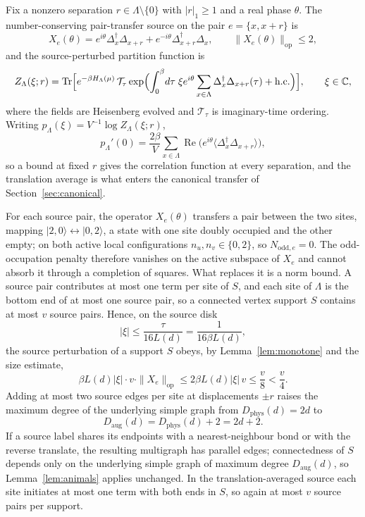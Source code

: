 \documentclass[11pt]{article}
\theoremstyle{plain}
\theoremstyle{definition}
\DeclareMathOperator{\Tr}{Tr}
\newcommand{\Dphys}{D_{\mathrm{phys}}}
\newcommand{\Daug}{D_{\mathrm{aug}}}
\newcommand{\Dop}{\Delta}
\begin{document}
Fix a nonzero separation $r\in\Lambda\setminus\{0\}$ with $|r|_1\ge1$ and a real
phase $\theta$. The number-conserving pair-transfer source on the pair
$e=\{x,x+r\}$ is
\begin{equation}\label{eq:source}
 X_e(\theta)=e^{i\theta}\Dop_x^\dagger\Dop_{x+r}+e^{-i\theta}\Dop_{x+r}^\dagger\Dop_x,
 \qquad\|X_e(\theta)\|_{\mathrm{op}}\le2,
\end{equation}
and the source-perturbed partition function is
\[
 Z_\Lambda(\xi;r)=\Tr\Bigl[e^{-\beta H_\Lambda(\mu)}\,
 \mathcal T_\tau\exp\Bigl(\int_0^\beta\!d\tau\;\xi e^{i\theta}
 \sum_{x\in\Lambda}\Dop_x^\dagger\Dop_{x+r}(\tau)+\text{h.c.}\Bigr)\Bigr],
 \qquad \xi\in\mathbb C,
\]
where the fields are Heisenberg evolved and $\mathcal T_\tau$ is imaginary-time
ordering. Writing $p_\Lambda(\xi)=V^{-1}\log Z_\Lambda(\xi;r)$,
\[
 p_\Lambda'(0)=\frac{2\beta}{V}\sum_{x\in\Lambda}
 \operatorname{Re}\bigl(e^{i\theta}\langle\Dop_x^\dagger\Dop_{x+r}\rangle\bigr),
\]
so a bound at fixed $r$ gives the correlation function at every separation, and the
translation average is what enters the canonical transfer of
Section~\ref{sec:canonical}.

For each source pair, the operator $X_e(\theta)$ transfers a pair between the two
sites, mapping $|2,0\rangle\leftrightarrow|0,2\rangle$, a state with one site doubly
occupied and the other empty; on both active local configurations $n_u,n_v\in\{0,2\}$,
so $N_{\mathrm{odd},e}=0$. The odd-occupation
penalty therefore vanishes on the active subspace of $X_e$ and cannot absorb it
through a completion of squares. What replaces it is a norm bound. A source pair
contributes at most one term per site of $S$, and each site of $\Lambda$ is the
bottom end of at most one source pair, so a connected vertex support $S$ contains at
most $v$ source pairs. Hence, on the source disk
\begin{equation}\label{eq:disk}
 |\xi|\le\frac{\tau}{16L(d)}=\frac{1}{16\beta L(d)},
\end{equation}
the source perturbation of a support $S$ obeys, by Lemma~\ref{lem:monotone} and the
size estimate,
\begin{equation}\label{eq:sourcepenalty}
 \beta L(d)|\xi|\cdot v\cdot\|X_e\|_{\mathrm{op}}\le2\beta L(d)|\xi|\,v\le\frac v8<\frac v4 .
\end{equation}
Adding at most two source edges per site at displacements $\pm r$ raises the maximum
degree of the underlying simple graph from $\Dphys(d)=2d$ to
\begin{equation}\label{eq:daug}
 \Daug(d)=\Dphys(d)+2=2d+2 .
\end{equation}
If a source label shares its endpoints with a nearest-neighbour bond or with the
reverse translate, the resulting multigraph has parallel edges; connectedness of $S$
depends only on the underlying simple graph of maximum degree $\Daug(d)$, so
Lemma~\ref{lem:animals} applies unchanged. In the translation-averaged source each
site initiates at most one term with both ends in $S$, so again at most $v$ source
pairs per support.
\end{document}
